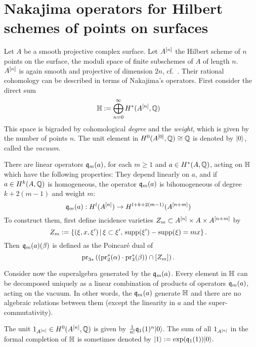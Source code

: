 \section{Nakajima operators for Hilbert schemes of points on surfaces}
\label{Section_Hilbert}
Let $A$ be a smooth projective complex surface. 
Let $A^{[n]}$ the Hilbert scheme of $n$ points on the surface, \ie the moduli space of finite subschemes of $A$ of length $n$.
$A^{[n]}$ is again smooth and projective of dimension $2n$, cf.~\cite{Fogarty}. 
Their rational cohomology can be described in terms of Nakajima's \cite{Nakajima} operators. First consider the direct sum
$$
\mathbb{H} := \bigoplus_{n=0}^{\infty} H^*(A^{[n]},\mathbb{Q})
$$
This space is bigraded by cohomological \emph{degree} and the \emph{weight}, which is given by the number of points $n$. The unit element in $H^0(A^{[0]},\mathbb{Q}) \cong \mathbb{Q}$ is denoted by $|0\rangle$, called the \emph{vacuum}.
\begin{definition}
There are linear operators $\mathfrak{q}_m(a)$, for each $m\geq 1$ and $a \in H^*(A,\mathbb{Q})$, acting on $\mathbb{H}$ which have the following properties: They depend linearly on $a$, and if $a\in H^k(A,\mathbb{Q})$ is homogeneous, the operator $\mathfrak{q}_{m}(a)$ is bihomogeneous of degree $k+2(m-1)$ and weight $m$:
$$
\mathfrak{q}_{m}(a) : H^l(A^{[n]}) \rightarrow H^{l+k+2(m-1)}(A^{[n+m]})
$$
To construct them, first define incidence varieties $Z_m\subset A^{[n]}\times A\times A^{[n+m]}$ by
$$
Z_m := \left\{(\xi,x,\xi')\, |\, \xi\subset\xi',\, \operatorname{supp}(\xi') -\operatorname{supp}(\xi) = mx \right\}.
$$
Then $\mathfrak{q}_m(a)(\beta) $ is defined as the Poincar\'e dual of 
$$
\operatorname{pr}_{3*}\left( \left(\operatorname{pr}_2^*(\alpha)\cdot \operatorname{pr}_3^*(\beta)\right) \cap [Z_m] \right).
$$
\end{definition}
Consider now the superalgebra generated by the $\mathfrak{q}_m(a)$. 
Every element in $\mathbb{H}$ can be decomposed uniquely as a linear combination of products of operators $\mathfrak{q}_{m}(a)$, acting on the vacuum. 
In other words, the $\mathfrak{q}_m(a)$ generate $\mathbb{H}$ and there are no algebraic relations between them (except the linearity in $a$ and the super-commutativity).
\begin{example}
The unit $1_{A^{[n]}} \in H^0({A^{[n]}},\mathbb{Q})$ is given by $\frac{1}{n!}\mathfrak{q}_1(1)^n|0\rangle$. The sum of all $1_{A^{[n]}}$ in the formal completion of $\mathbb{H}$ is sometimes denoted by
$
\left|1\right> := \exp(\mathfrak{q}_1(1))|0\rangle.
$
\end{example}

